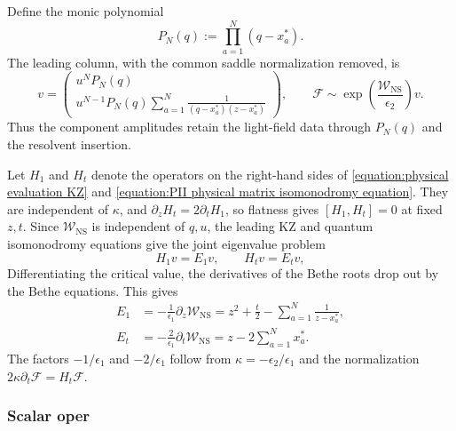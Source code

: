 \documentclass[a4paper,11pt]{article}
\newcommand{\cF}{\mathcal{F}}
\numberwithin{equation}{section}
\begin{document}
Define the monic polynomial
\begin{equation}
	P_{N}(q):=\prod_{a=1}^{N}(q-x_{a}^{*}).
\end{equation}
The leading column, with the common saddle normalization removed,
is
\begin{equation}
	\label{equation:PII NS Bethe vector}
	v=\begin{pmatrix}
		u^{N}P_{N}(q)\\[1mm]
		\displaystyle u^{N-1}P_{N}(q)
		\sum_{a=1}^{N}\frac{1}{(q-x_{a}^{*})(z-x_{a}^{*})}
	\end{pmatrix},
	\qquad
	\cF\sim\exp\left(\frac{\mathcal{W}_{\mathrm{NS}}}{\epsilon_{2}}\right)v.
\end{equation}
Thus the component amplitudes retain the light-field data through
$P_{N}(q)$ and the resolvent insertion.

Let $H_{1}$ and $H_{t}$ denote the operators on the right-hand
sides of \eqref{equation:physical evaluation KZ} and
\eqref{equation:PII physical matrix isomonodromy equation}.
They are independent of $\kappa$, and
$\partial_{z}H_{t}=2\partial_{t}H_{1}$, so flatness gives
$[H_{1},H_{t}]=0$ at fixed $z,t$.  Since
$\mathcal{W}_{\mathrm{NS}}$ is independent of $q,u$, the leading
KZ and quantum isomonodromy equations give the joint eigenvalue problem
\begin{equation}
	H_{1}v=E_{1}v,
	\qquad H_{t}v=E_{t}v,
\end{equation}
Differentiating the critical value, the derivatives of the Bethe
roots drop out by the Bethe equations.  This gives
\begin{equation}
	\label{equation:PII NS derivatives superpotential}
	\begin{aligned}
		E_{1}
		&=-\frac{1}{\epsilon_{1}}\partial_{z}\mathcal{W}_{\mathrm{NS}}
		=z^{2}+\frac{t}{2}-\sum_{a=1}^{N}\frac{1}{z-x_{a}^{*}},\\
		E_{t}
		&=-\frac{2}{\epsilon_{1}}\partial_{t}\mathcal{W}_{\mathrm{NS}}
		=z-2\sum_{a=1}^{N}x_{a}^{*}.
	\end{aligned}
\end{equation}
The factors $-1/\epsilon_{1}$ and $-2/\epsilon_{1}$ follow from
$\kappa=-\epsilon_{2}/\epsilon_{1}$ and the normalization
$2\kappa\partial_{t}\cF=H_{t}\cF$.

\subsubsection{Scalar oper}
\label{subsection:PII NS scalar oper}
\end{document}
